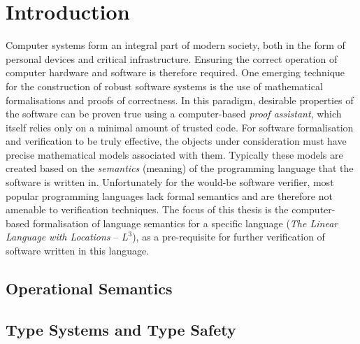 \documentclass[]{unswthesis}
\begin{document}
\frontmatter  
\maketitle


% 
% 

\tableofcontents

\mainmatter

% 
\chapter{Introduction}
\label{ch:intro}

Computer systems form an integral part of modern society, both in the form of personal devices and critical infrastructure. Ensuring the correct operation of computer hardware and software is therefore required. One emerging technique for the construction of robust software systems is the use of mathematical formalisations and proofs of correctness. In this paradigm, desirable properties of the software can be proven true using a computer-based \textit{proof assistant}, which itself relies only on a minimal amount of trusted code. For software formalisation and verification to be truly effective, the objects under consideration must have precise mathematical models associated with them. Typically these models are created based on the \textit{semantics} (meaning) of the programming language that the software is written in. Unfortunately for the would-be software verifier, most popular programming languages lack formal semantics and are therefore not amenable to verification techniques. The focus of this thesis is the computer-based formalisation of language semantics for a specific language (\textit{The Linear Language with Locations} -- $L^3$), as a pre-requisite for further verification of software written in this language.

\section{Operational Semantics}

\section{Type Systems and Type Safety}
\end{document}
